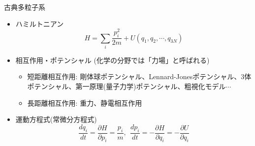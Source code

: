 
\begin{frame}[t,fragile]{古典多粒子系}
  \begin{itemize}
  \item ハミルトニアン
    \[
    H = \sum_i \frac{p_i^2}{2m} + U(q_1, q_2, \cdots, q_{3N})
    \]
  \item 相互作用・ポテンシャル (化学の分野では「力場」と呼ばれる)
    \begin{itemize}
    \item 短距離相互作用: 剛体球ポテンシャル、Lennard-Jonesポテンシャル、3体ポテンシャル、第一原理(量子力学)ポテンシャル、粗視化モデル$\cdots$
    \item 長距離相互作用: 重力、静電相互作用
    \end{itemize}
  \item 運動方程式(常微分方程式)
    \[
    \frac{dq_i}{dt} = \frac{\partial H}{\partial p_i} = \frac{p_i}{m}, \ \ \frac{dp_i}{dt} = - \frac{\partial H}{\partial q_i} = - \frac{\partial U}{\partial q_i}
    \]
  \end{itemize}
\end{frame}
